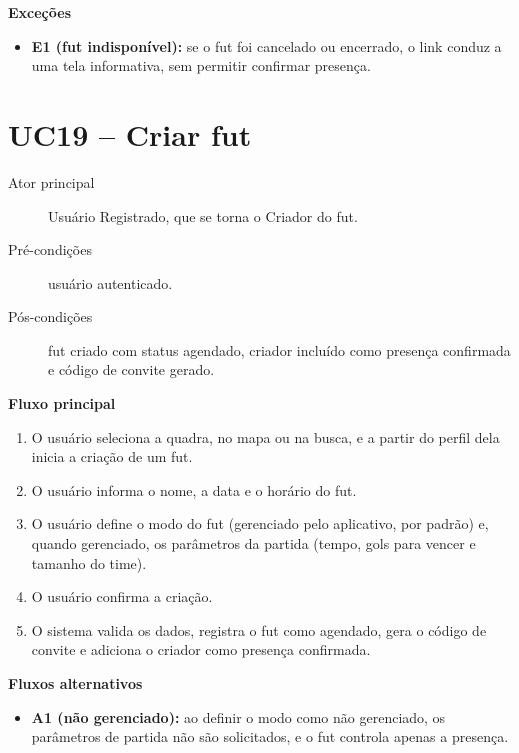 \begin{apendicesenv}
        \noindent\textbf{Exceções}
        \begin{itemize}
            \item \textbf{E1 (fut indisponível):} se o fut foi cancelado ou encerrado, o link conduz a uma tela informativa, sem permitir confirmar presença.
        \end{itemize}

    \section*{UC19 -- Criar fut}
        \begin{description}
            \item[Ator principal] Usuário Registrado, que se torna o Criador do fut.
            \item[Pré-condições] usuário autenticado.
            \item[Pós-condições] fut criado com status agendado, criador incluído como presença confirmada e código de convite gerado.
        \end{description}

        \noindent\textbf{Fluxo principal}
        \begin{enumerate}
            \item O usuário seleciona a quadra, no mapa ou na busca, e a partir do perfil dela inicia a criação de um fut.
            \item O usuário informa o nome, a data e o horário do fut.
            \item O usuário define o modo do fut (gerenciado pelo aplicativo, por padrão) e, quando gerenciado, os parâmetros da partida (tempo, gols para vencer e tamanho do time).
            \item O usuário confirma a criação.
            \item O sistema valida os dados, registra o fut como agendado, gera o código de convite e adiciona o criador como presença confirmada.
        \end{enumerate}

        \noindent\textbf{Fluxos alternativos}
        \begin{itemize}
            \item \textbf{A1 (não gerenciado):} ao definir o modo como não gerenciado, os parâmetros de partida não são solicitados, e o fut controla apenas a presença.
        \end{itemize}


\end{apendicesenv}
